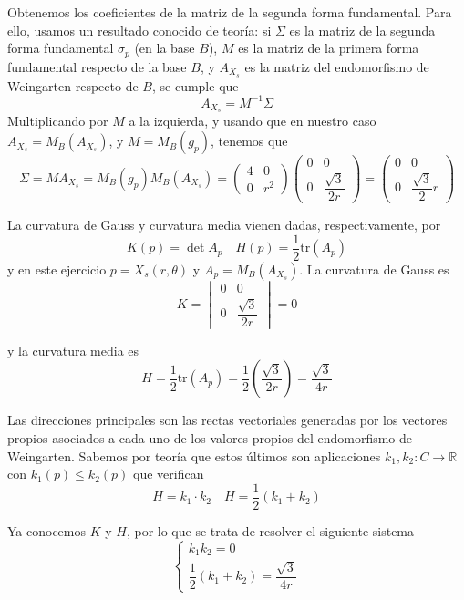 \documentclass[12pt]{article}
\newcommand{\R}{\mathbb{R}}
\newcommand{\tr}{\text{tr}}
\begin{document}
\begin{ejercicio}
\begin{enumerate}
            Obtenemos los coeficientes de la matriz de la segunda forma fundamental. Para ello, usamos un resultado conocido de teoría:
            si $\Sigma$ es la matriz de la segunda forma fundamental $\sigma_p$ (en la base $B$), $M$ es la matriz de la primera forma 
            fundamental respecto de la base $B$, y $A_{X_s}$ es la matriz del endomorfismo de Weingarten respecto de $B$, se cumple que 
            $$A_{X_s} = M^{-1} \Sigma$$ Multiplicando por $M$ a la izquierda, y usando que en nuestro caso $A_{X_s} = M_B(A_{X_s})$, y 
            $M = M_B(g_p)$, tenemos que $$\boxed{\Sigma = M A_{X_s} = M_B(g_p) M_B(A_{X_s}) = \begin{pmatrix}
                4 & 0 \\
                0 & r^2
            \end{pmatrix} \begin{pmatrix}
                0 & 0 \\
                0 & \dfrac{\sqrt{3}}{2r}
            \end{pmatrix} = \begin{pmatrix}
                0 & 0 \\
                0 & \dfrac{\sqrt{3}}{2} r
            \end{pmatrix}}$$

            La curvatura de Gauss y curvatura media vienen dadas, respectivamente, por
            $$K(p) = \det A_p \quad H(p) = \dfrac{1}{2} \tr (A_p)$$
            y en este ejercicio $p = X_s(r, \theta)$ y $A_p = M_B(A_{X_s})$.
            La curvatura de Gauss es
            $$\boxed{K = \begin{vmatrix}
                0 & 0 \\
                0 & \dfrac{\sqrt{3}}{2r}
            \end{vmatrix} = 0}$$

            y la curvatura media es
            $$\boxed{H = \dfrac{1}{2} \tr (A_p) = \dfrac{1}{2} \left(\dfrac{\sqrt{3}}{2r}\right) = \dfrac{\sqrt{3}}{4r}}$$

            Las direcciones principales son las rectas vectoriales generadas por los vectores propios asociados a cada uno de los valores propios del 
            endomorfismo de Weingarten. Sabemos por teoría que estos últimos son aplicaciones
            $k_1,k_2 : C \to \R$ con $k_1(p) \leq k_2(p)$ que verifican
            $$H = k_1 \cdot k_2 \quad H = \dfrac{1}{2}(k_1 + k_2)$$

            Ya conocemos $K$ y $H$, por lo que se trata de resolver el siguiente sistema
            $$\begin{cases}
                k_1 k_2 = 0 \\
                \dfrac{1}{2}(k_1 + k_2) = \dfrac{\sqrt{3}}{4r}
            \end{cases}$$


\end{enumerate}
\end{ejercicio}
\end{document}
